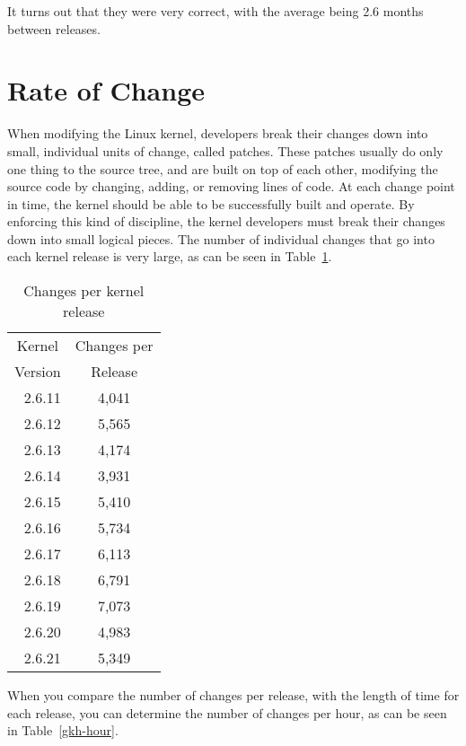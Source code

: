 \documentclass[final]{ols}
\begin{document}
It turns out that they were very correct, with the average being 2.6
months between releases.

\section{Rate of Change}

When modifying the Linux kernel, developers break their changes down
into small, individual units of change, called patches.  These patches
usually do only one thing to the source tree, and are built on top of
each other, modifying the source code by changing, adding, or removing
lines of code.  At each change point in time, the kernel should be able
to be successfully built and operate.  By enforcing this kind of
discipline, the kernel developers must break their changes down into
small logical pieces.  The number of individual changes that go into
each kernel release is very large, as can be seen in Table~\ref{gkh-changes}.

\begin{table}%
\begin{center}
\begin{tabular}{|r|c|}
\hline
\multicolumn{1}{|c|}{Kernel}  & \multicolumn{1}{|c|}{Changes per} \\
 \multicolumn{1}{|c|}{Version} &  \multicolumn{1}{|c|}{Release}\\
\hline
\hline
\rule[-0.1ex]{0pt}{2.5ex}2.6.11	& 4,041	\\
2.6.12	& 5,565	\\
2.6.13	& 4,174	\\
2.6.14	& 3,931	\\
2.6.15	& 5,410	\\
2.6.16	& 5,734	\\
2.6.17	& 6,113	\\
2.6.18	& 6,791	\\
2.6.19	& 7,073	\\
2.6.20	& 4,983	\\
2.6.21	& 5,349	\\
\hline
\end{tabular}
\caption{Changes per kernel release}
\label{gkh-changes}
\end{center}
\end{table}

When you compare the number of changes per release, with the length of
time for each release, you can determine the number of changes per hour, as can
be seen in Table~\ref{gkh-hour}.
\end{document}
